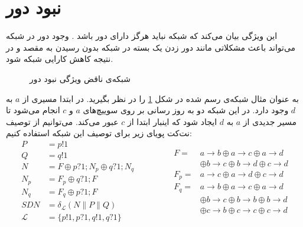 \documentclass[
msc,
irfonts
]{./tex/tehran-thesis}
\newcommand{\پ}{پروژه/پایان‌نامه/رساله }
\theoremstyle{definition}
\theoremstyle{theorem}
\theoremstyle{definition}
\numberwithin{algorithm}{chapter}
\newcommand{\s}[1]{\{#1\}}
\newcommand{\ra}{\rightarrow}
\begin{document}
 
\section{نبود دور}
این ویژگی بیان می‌کند که شبکه‌ نباید هرگز دارای دور باشد
\cite{foerster2018survey}.
وجود دور در شبکه می‌تواند باعث مشکلاتی مانند دور زدن یک بسته در شبکه بدون رسیدن به مقصد و در نتیجه کاهش کارایی شبکه شود.
\begin{figure}
    \centering
    \caption{ 
        شبکه‌ی ناقض ویژگی نبود دور
    }
    \label{fig:loop}
\end{figure}
به عنوان مثال شبکه‌ی رسم شده در شکل
\ref{fig:loop}
را در نظر بگیرید.
در ابتدا مسیری از
$a$
به
$d$
وجود دارد.
در این شبکه دو به روز رسانی بر روی سوییچ‌های
$a$
و
$c$
انجام می‌شود تا مسیر جدیدی از
$a$
به
$d$
ایجاد شود که اینبار ابتدا از
$c$
عبور می‌کند.
می‌توانیم از توصیف نت‌کت پویای زیر برای توصیف این شبکه استفاده کنیم:
\begin{equation*}
    \begin{aligned}
        P           & = p!1                                             \\
        Q           & = q!1                                             \\
        N           & = F \oplus p?1;N_p \oplus q?1;N_q                 \\
        N_p         & = F_p \oplus q?1;F                                \\
        N_q         & = F_q \oplus p?1;F                                \\
        SDN         & = \delta_{\mathcal{L}}(N \parallel P \parallel Q) \\
        \mathcal{L} & = \s{p!1,p?1,q!1,q?1}
    \end{aligned}
    \qquad \qquad
    \begin{aligned}
        F    = & a\ra b \oplus a\ra c \oplus a\ra d               \\
               & \oplus b\ra c \oplus b\ra d \oplus c\ra d        \\
        F_p  = & a\ra c \oplus a\ra d \oplus c\ra d               \\
        F_q  = & a\ra b \oplus a\ra c \oplus a\ra d               \\
               & \oplus b\ra c \oplus b\ra b \oplus b\ra d        \\
               & \oplus        c\ra b \oplus c\ra c \oplus c\ra d
    \end{aligned}
\end{equation*}
\end{document}
